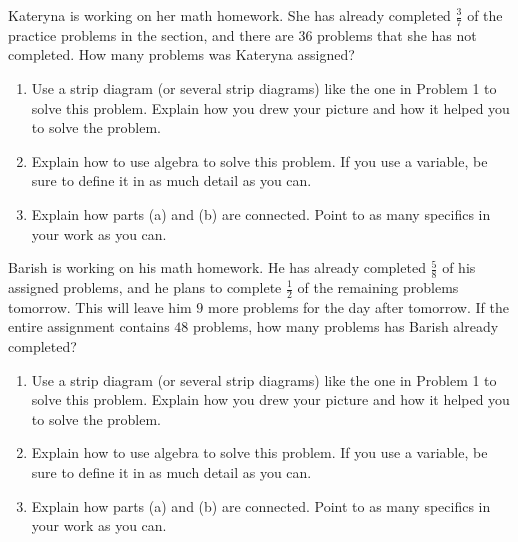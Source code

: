 \documentclass[nooutcomes,noauthor,handout]{ximera}
\begin{document}
\newpage

\begin{problem}
Kateryna is working on her math homework. She has already completed $\frac{3}{7}$ of 
the practice problems in the section, and there are $36$ problems that she has not 
completed. How many problems was Kateryna assigned?


\begin{enumerate}
	\item Use a strip diagram (or several strip diagrams) like the one in Problem 1 to solve this problem. Explain how you drew your picture and how it helped you to solve the problem.
	\item Explain how to use algebra to solve this problem. If you use a variable, be sure to define it in as much detail as you can.
	\item Explain how parts (a) and (b) are connected. Point to as many specifics in your work as you can.
\end{enumerate}
\end{problem}





\begin{problem}
Barish is working on his math homework. He has already completed $\frac{5}{8}$ of his assigned problems, and he plans to complete $\frac{1}{2}$ of the remaining problems tomorrow. This will leave him $9$ more problems for the day after tomorrow. If the entire assignment contains $48$ problems, how many problems has Barish already completed?


\begin{enumerate}
	\item Use a strip diagram (or several strip diagrams) like the one in Problem 1 to solve this problem. Explain how you drew your picture and how it helped you to solve the problem.
	\item Explain how to use algebra to solve this problem. If you use a variable, be sure to define it in as much detail as you can.
	\item Explain how parts (a) and (b) are connected. Point to as many specifics in your work as you can.
\end{enumerate}
\end{problem}
\end{document}
